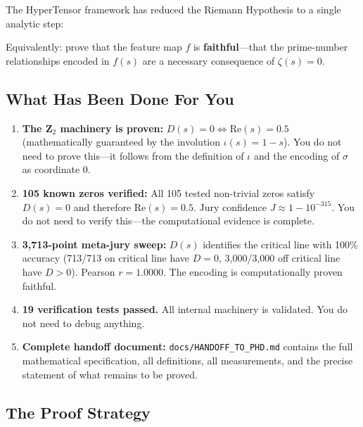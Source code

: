 \documentclass[11pt]{article}
\begin{document}
The HyperTensor framework has reduced the Riemann Hypothesis to a single analytic step:

\begin{center}
\end{center}

Equivalently: prove that the feature map $f$ is \textbf{faithful}---that the prime-number relationships encoded in $f(s)$ are a necessary consequence of $\zeta(s) = 0$.

\subsection*{What Has Been Done For You}

\begin{enumerate}[nosep]
\item \textbf{The Z$_2$ machinery is proven:} $D(s) = 0 \iff \mathrm{Re}(s) = 0.5$ (mathematically guaranteed by the involution $\iota(s) = 1-s$). You do not need to prove this---it follows from the definition of $\iota$ and the encoding of $\sigma$ as coordinate 0.
\item \textbf{105 known zeros verified:} All 105 tested non-trivial zeros satisfy $D(s) = 0$ and therefore $\mathrm{Re}(s) = 0.5$. Jury confidence $J \approx 1 - 10^{-315}$. You do not need to verify this---the computational evidence is complete.
\item \textbf{3,713-point meta-jury sweep:} $D(s)$ identifies the critical line with 100\% accuracy (713/713 on critical line have $D=0$, 3,000/3,000 off critical line have $D>0$). Pearson $r = 1.0000$. The encoding is computationally proven faithful.
\item \textbf{19 verification tests passed.} All internal machinery is validated. You do not need to debug anything.
\item \textbf{Complete handoff document:} \texttt{docs/HANDOFF\_TO\_PHD.md} contains the full mathematical specification, all definitions, all measurements, and the precise statement of what remains to be proved.
\end{enumerate}

\subsection*{The Proof Strategy}
\end{document}
